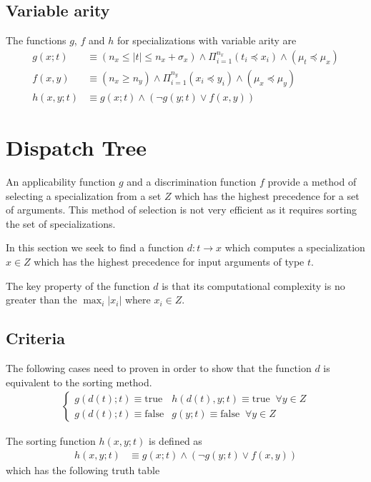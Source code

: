 \documentclass{article}
\newcommand{\true}{\textrm{true}}
\newcommand{\false}{\textrm{false}}
\begin{document}
\subsection{Variable arity}
The functions $g$, $f$ and $h$ for specializations with variable arity
are
\begin{align}
  g(x;t) &\equiv (n_x \leq |t| \leq n_x + \sigma_x)
                 \land \Pi_{i=1}^{n_x} (t_i \preceq x_i)
                 \land ( \mu_t \preceq \mu_x ) \\
  f(x,y) &\equiv (n_x \geq n_y)
                 \land \Pi_{i=1}^{n_y}(x_i \preceq y_i)
                 \land ( \mu_x \preceq \mu_y )\\
  h(x,y;t) &\equiv g(x;t) \land (\lnot g(y;t) \lor f(x,y) )
\end{align}

\section{Dispatch Tree}
An applicability function $g$ and a discrimination function $f$
provide a method of selecting a specialization from a set $Z$ which
has the highest precedence for a set of arguments. This method of
selection is not very efficient as it requires sorting the set of
specializations.

In this section we seek to find a function $d : t \rightarrow x$ which
computes a specialization $x \in Z$ which has the highest precedence
for input arguments of type $t$.

The key property of the function $d$ is that its computational
complexity is no greater than the $\max_i |x_i|$ where $x_i \in Z$.

\subsection{Criteria}
The following cases need to proven in order to show that the function
$d$ is equivalent to the sorting method.
\begin{align}
  \begin{cases}
    g(d(t); t) \equiv \true & h(d(t),y;t) \equiv \true \;\; \forall y \in Z \\
    g(d(t); t) \equiv \false & g(y;t) \equiv \false \;\; \forall y \in Z
  \end{cases}
\end{align}

\noindent The sorting function $h(x,y;t)$ is defined as
\begin{align}
  h(x,y;t) &\equiv g(x;t) \land (\lnot g(y;t) \lor f(x,y) )
\end{align}
which has the following truth table
\end{document}
